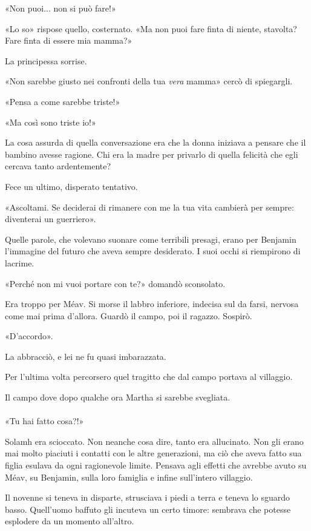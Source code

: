 \documentclass[a4paper,12pt]{book}
\begin{document}
«Non puoi... non si può fare!»

«Lo so» rispose quello, costernato. «Ma non puoi fare finta di niente,
stavolta? Fare finta di essere mia mamma?»

La principessa sorrise.

«Non sarebbe giusto nei confronti della tua \emph{vera} mamma» cercò di
spiegargli.

«Pensa a come sarebbe triste!»

«Ma così sono triste io!»

La cosa assurda di quella conversazione era che la donna iniziava a pensare che
il bambino avesse ragione. Chi era la madre per privarlo di quella felicità che
egli cercava tanto ardentemente?

Fece un ultimo, disperato tentativo.

«Ascoltami. Se deciderai di rimanere con me la tua vita cambierà per sempre:
diventerai un guerriero».

Quelle parole, che volevano suonare come terribili presagi, erano per Benjamin
l'immagine del futuro che aveva sempre desiderato. I suoi occhi si riempirono di
lacrime.

«Perché non mi vuoi portare con te?» domandò sconsolato.

Era troppo per Méav. Si morse il labbro inferiore, indecisa sul da farsi,
nervosa come mai prima d'allora. Guardò il campo, poi il ragazzo. Sospirò.

«D'accordo».

La abbracciò, e lei ne fu quasi imbarazzata.

Per l'ultima volta percorsero quel tragitto che dal campo portava al villaggio.

Il campo dove dopo qualche ora Martha si sarebbe svegliata.

\paragraph{}
«Tu hai fatto cosa?!»

Solamh era scioccato. Non neanche cosa dire, tanto era allucinato. Non gli erano
mai molto piaciuti i contatti con le altre generazioni, ma ciò che aveva fatto
sua figlia esulava da ogni ragionevole limite. Pensava agli effetti che avrebbe
avuto su Méav, su Benjamin, sulla loro famiglia e infine sull'intero villaggio.

Il novenne si teneva in disparte, strusciava i piedi a terra e teneva lo sguardo
basso. Quell'uomo baffuto gli incuteva un certo timore: sembrava che potesse
esplodere da un momento all'altro.
\end{document}
